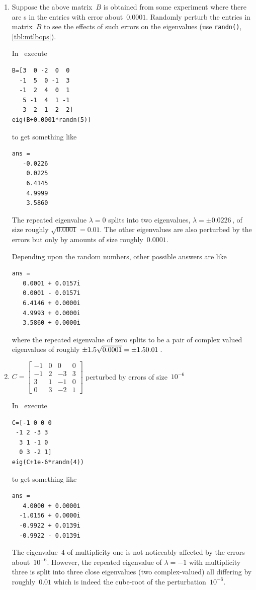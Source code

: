 \begin{example}
\begin{enumerate}
\item Suppose the above matrix~\(B\) is obtained from some experiment where there are s in the entries with error about~\(0.0001\).
Randomly perturb the entries in matrix~\(B\) to see the effects of such errors on the eigenvalues (use \verb|randn()|, \autoref{tbl:mtlbops}).
\begin{solution} 
In \script\ execute
\begin{verbatim}
B=[3  0 -2  0  0
  -1  5  0 -1  3
  -1  2  4  0  1
   5 -1  4  1 -1
   3  2  1 -2  2]
eig(B+0.0001*randn(5))
\end{verbatim}
\setbox\ajrqrbox\hbox{}%
\marginpar{\usebox{\ajrqrbox}}%
to get something like
\begin{verbatim}
ans =
   -0.0226
    0.0225
    6.4145
    4.9999
    3.5860
\end{verbatim}
The repeated eigenvalue \(\lambda=0\) splits into two eigenvalues, \(\lambda=\pm0.0226\)\,, of size roughly \(\sqrt{0.0001}=0.01\).
The other eigenvalues are also perturbed by the errors but only by amounts of size roughly~\(0.0001\).

Depending upon the random numbers, other possible answers are like
\begin{verbatim}
ans =
   0.0001 + 0.0157i
   0.0001 - 0.0157i
   6.4146 + 0.0000i
   4.9993 + 0.0000i
   3.5860 + 0.0000i
\end{verbatim}
where the repeated eigenvalue of zero splits to be a pair of complex valued eigenvalues of roughly \(\pm 1.5\sqrt{0.0001}=\pm 1.50.01\)\,.
\end{solution}



\item \(C=\begin{bmatrix}-1&0&0&0
\\-1&2&-3&3
\\3&1&-1&0
\\0&3&-2&1\end{bmatrix}\) perturbed by errors of size~\(10^{-6}\)
\begin{solution} 
In \script\ execute
\begin{verbatim}
C=[-1 0 0 0
 -1 2 -3 3
  3 1 -1 0
  0 3 -2 1]
eig(C+1e-6*randn(4))
\end{verbatim}
\setbox\ajrqrbox\hbox{}%
\marginpar{\usebox{\ajrqrbox}}%
to get something like
\begin{verbatim}
ans =
   4.0000 + 0.0000i
  -1.0156 + 0.0000i
  -0.9922 + 0.0139i
  -0.9922 - 0.0139i
\end{verbatim}
The eigenvalue~\(4\) of multiplicity one is not noticeably affected by the errors about~\(10^{-6}\).
However, the repeated eigenvalue of \(\lambda=-1\) with multiplicity three is split into three close eigenvalues (two complex-valued) all differing by roughly~\(0.01\) which is indeed the cube-root of the perturbation~\(10^{-6}\).
\end{solution}


\end{enumerate}
\end{example}

